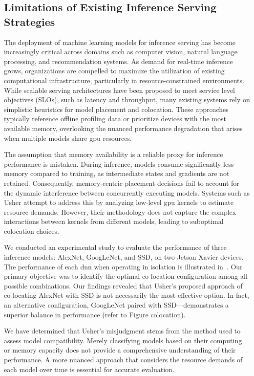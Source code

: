 \subsection{Limitations of Existing Inference Serving Strategies}

The deployment of machine learning models for inference serving has become increasingly critical across domains such as computer vision, natural language processing, and recommendation systems. As demand for real-time inference grows, organizations are compelled to maximize the utilization of existing computational infrastructure, particularly in resource-constrained environments. While scalable serving architectures have been proposed to meet service level objectives (SLOs), such as latency and throughput, many existing systems rely on simplistic heuristics for model placement and colocation. These approaches typically reference offline profiling data or prioritize devices with the most available memory, overlooking the nuanced performance degradation that arises when multiple models share \acrshort{gpu} resources.

The assumption that memory availability is a reliable proxy for inference performance is mistaken. During inference, models consume significantly less memory compared to training, as intermediate states and gradients are not retained. Consequently, memory-centric placement decisions fail to account for the dynamic interference between concurrently executing models. Systems such as Usher attempt to address this by analyzing low-level \acrshort{gpu} kernels to estimate resource demands. However, their methodology does not capture the complex interactions between kernels from different models, leading to suboptimal colocation choices.

We conducted an experimental study to evaluate the performance of three inference models: AlexNet, GoogLeNet, and SSD, on two Jetson Xavier devices. The performance of each \acrfull{dnn} when operating in isolation is illustrated in~. Our primary objective was to identify the optimal co-location configuration among all possible combinations. Our findings revealed that Usher's proposed approach of co-locating AlexNet with SSD is not necessarily the most effective option. In fact, an alternative configuration, GoogLeNet paired with SSD—demonstrates a superior balance in performance (refer to Figure colocation).

We have determined that Usher's misjudgment stems from the method used to assess model compatibility. Merely classifying models based on their computing or memory capacity does not provide a comprehensive understanding of their performance. A more nuanced approach that considers the resource demands of each model over time is essential for accurate evaluation.


